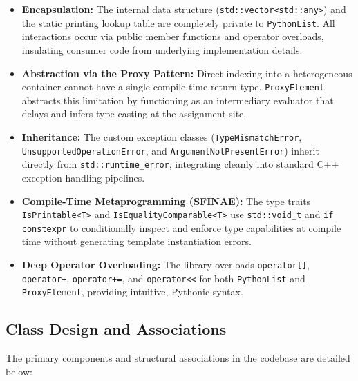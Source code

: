 \documentclass[12pt,a4paper]{report}
\begin{document}
\begin{itemize}
    \item \textbf{Encapsulation:} The internal data structure (\texttt{std::vector<std::any>}) and the static printing lookup table are completely private to \texttt{PythonList}. All interactions occur via public member functions and operator overloads, insulating consumer code from underlying implementation details.
    
    \item \textbf{Abstraction via the Proxy Pattern:} Direct indexing into a heterogeneous container cannot have a single compile-time return type. \texttt{ProxyElement} abstracts this limitation by functioning as an intermediary evaluator that delays and infers type casting at the assignment site.
    
    \item \textbf{Inheritance:} The custom exception classes (\texttt{Type\-Mis\-match\-Er\-ror}, \texttt{Un\-sup\-port\-ed\-Op\-er\-a\-tion\-Er\-ror}, and \texttt{Ar\-gu\-ment\-Not\-Pre\-sent\-Er\-ror}) inherit directly from \texttt{std::run\-time\_\allowbreak error}, integrating cleanly into standard C++ exception handling pipelines.
    
    \item \textbf{Compile-Time Metaprogramming (SFINAE):} The type traits \texttt{IsPrintable<T>} and \texttt{IsEqualityComparable<T>} use \texttt{std::void\_t} and \texttt{if constexpr} to conditionally inspect and enforce type capabilities at compile time without generating template instantiation errors.
    
    \item \textbf{Deep Operator Overloading:} The library overloads \texttt{operator[]}, \texttt{operator+}, \texttt{operator+=}, and \texttt{operator<<} for both \texttt{PythonList} and \texttt{ProxyElement}, providing intuitive, Pythonic syntax.
\end{itemize}

\subsection{Class Design and Associations}

The primary components and structural associations in the codebase are detailed below:
\end{document}
